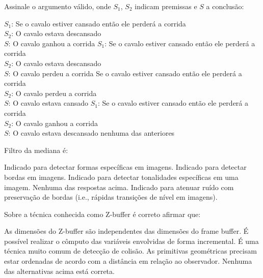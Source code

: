 \documentclass[12pt, addpoints]{exam}
\begin{document}
\begin{questions}
\question

Assinale o argumento válido, onde \( S_1 \), \( S_2 \) indicam premissas e \( S \) a conclusão:


\begin{choices}
\choice \( S_1 \): Se o cavalo estiver cansado então ele perderá a corrida \\

              \( S_2 \): O cavalo estava descansado \\

              \( S \): O cavalo ganhou a corrida
\choice \( S_1 \): Se o cavalo estiver cansado então ele perderá a corrida \\

              \( S_2 \): O cavalo estava descansado \\

              \( S \): O cavalo perdeu a corrida
\choice Se o cavalo estiver cansado então ele perderá a corrida \\

              \( S_2 \): O cavalo perdeu a corrida \\

              \( S \): O cavalo estava cansado
\choice \( S_1 \): Se o cavalo estiver cansado então ele perderá a corrida \\

              \( S_2 \): O cavalo ganhou a corrida \\

              \( S \): O cavalo estava descansado
\choice nenhuma das anteriores
\end{choices}

\question

Filtro da mediana é:
\begin{choices}
\choice Indicado para detectar formas específicas em imagens.
\choice Indicado para detectar bordas em imagens.
\choice Indicado para detectar tonalidades específicas em uma imagem.
\choice Nenhuma das respostas acima.
\choice Indicado para atenuar ruído com preservação de bordas (i.e., rápidas transições de nível em imagens).
\end{choices}

\question

Sobre a técnica conhecida como Z-buffer é correto afirmar que:
\begin{choices}
\choice As dimensões do Z-buffer são independentes das dimensões do frame buffer. 
\choice É possível realizar o cômputo das variáveis envolvidas de forma incremental.
\choice É uma técnica muito comum de detecção de colisão. 
\choice As primitivas geométricas precisam estar ordenadas de acordo com a distância em relação ao observador. 
\choice Nenhuma das alternativas acima está correta. 
\end{choices}


\end{questions}
\end{document}
